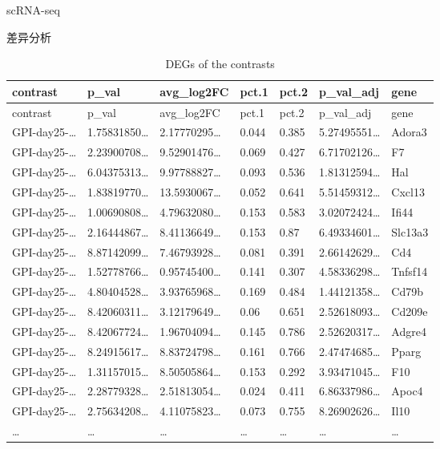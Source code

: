 \documentclass[
  ignorenonframetext,
]{beamer}
\begin{document}
\begin{frame}[fragile]{scRNA-seq}
\begin{block}{差异分析}
\begin{longtable}[]{@{}lllllll@{}}
\caption{DEGs of the contrasts}\tabularnewline
\toprule
contrast & p\_val & avg\_log2FC & pct.1 & pct.2 & p\_val\_adj &
gene\tabularnewline
\midrule
\endfirsthead
\toprule
contrast & p\_val & avg\_log2FC & pct.1 & pct.2 & p\_val\_adj &
gene\tabularnewline
\midrule
\endhead
GPI-day25-\ldots{} & 1.75831850\ldots{} & 2.17770295\ldots{} & 0.044 &
0.385 & 5.27495551\ldots{} & Adora3\tabularnewline
GPI-day25-\ldots{} & 2.23900708\ldots{} & 9.52901476\ldots{} & 0.069 &
0.427 & 6.71702126\ldots{} & F7\tabularnewline
GPI-day25-\ldots{} & 6.04375313\ldots{} & 9.97788827\ldots{} & 0.093 &
0.536 & 1.81312594\ldots{} & Hal\tabularnewline
GPI-day25-\ldots{} & 1.83819770\ldots{} & 13.5930067\ldots{} & 0.052 &
0.641 & 5.51459312\ldots{} & Cxcl13\tabularnewline
GPI-day25-\ldots{} & 1.00690808\ldots{} & 4.79632080\ldots{} & 0.153 &
0.583 & 3.02072424\ldots{} & Ifi44\tabularnewline
GPI-day25-\ldots{} & 2.16444867\ldots{} & 8.41136649\ldots{} & 0.153 &
0.87 & 6.49334601\ldots{} & Slc13a3\tabularnewline
GPI-day25-\ldots{} & 8.87142099\ldots{} & 7.46793928\ldots{} & 0.081 &
0.391 & 2.66142629\ldots{} & Cd4\tabularnewline
GPI-day25-\ldots{} & 1.52778766\ldots{} & 0.95745400\ldots{} & 0.141 &
0.307 & 4.58336298\ldots{} & Tnfsf14\tabularnewline
GPI-day25-\ldots{} & 4.80404528\ldots{} & 3.93765968\ldots{} & 0.169 &
0.484 & 1.44121358\ldots{} & Cd79b\tabularnewline
GPI-day25-\ldots{} & 8.42060311\ldots{} & 3.12179649\ldots{} & 0.06 &
0.651 & 2.52618093\ldots{} & Cd209e\tabularnewline
GPI-day25-\ldots{} & 8.42067724\ldots{} & 1.96704094\ldots{} & 0.145 &
0.786 & 2.52620317\ldots{} & Adgre4\tabularnewline
GPI-day25-\ldots{} & 8.24915617\ldots{} & 8.83724798\ldots{} & 0.161 &
0.766 & 2.47474685\ldots{} & Pparg\tabularnewline
GPI-day25-\ldots{} & 1.31157015\ldots{} & 8.50505864\ldots{} & 0.153 &
0.292 & 3.93471045\ldots{} & F10\tabularnewline
GPI-day25-\ldots{} & 2.28779328\ldots{} & 2.51813054\ldots{} & 0.024 &
0.411 & 6.86337986\ldots{} & Apoc4\tabularnewline
GPI-day25-\ldots{} & 2.75634208\ldots{} & 4.11075823\ldots{} & 0.073 &
0.755 & 8.26902626\ldots{} & Il10\tabularnewline
\ldots{} & \ldots{} & \ldots{} & \ldots{} & \ldots{} & \ldots{} &
\ldots{}\tabularnewline
\bottomrule
\end{longtable}

\begin{center}\vspace{1.5cm}\end{center}


\end{block}
\end{frame}
\end{document}
